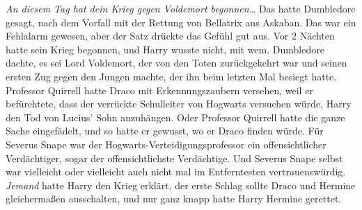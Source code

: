\emph{An diesem Tag hat dein Krieg gegen Voldemort begonnen…}
Das hatte Dumbledore gesagt, nach dem Vorfall mit der Rettung von Bellatrix aus Askaban. Das war ein Fehlalarm gewesen, aber der Satz drückte das Gefühl gut aus.
Vor 2 Nächten hatte sein Krieg begonnen, und Harry wusste nicht, mit wem.
Dumbledore dachte, es sei Lord Voldemort, der von den Toten zurückgekehrt war und seinen ersten Zug gegen den Jungen machte, der ihn beim letzten Mal besiegt hatte.
Professor Quirrell hatte Draco mit Erkennungszaubern versehen, weil er befürchtete, dass der verrückte Schulleiter von Hogwarts versuchen würde, Harry den Tod von Lucius’ Sohn anzuhängen.
Oder Professor Quirrell hatte die ganze Sache eingefädelt, und so hatte er gewusst, wo er Draco finden würde. Für Severus Snape war der Hogwarts-Verteidigungsprofessor ein offensichtlicher Verdächtiger, sogar der offensichtlichste Verdächtige.
Und Severus Snape selbst war vielleicht oder vielleicht auch nicht mal im Entferntesten vertrauenswürdig.
\emph{Jemand} hatte Harry den Krieg erklärt, der erste Schlag sollte Draco und Hermine gleichermaßen ausschalten, und nur ganz knapp hatte Harry Hermine gerettet.
